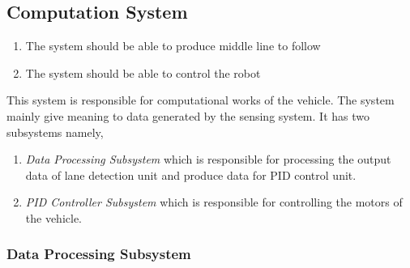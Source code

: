 \documentclass[a4paper,12pt]{article}
\begin{document}
	
	
	
	
			
		
		\subsection{Computation System}
		
		\begin{enumerate}
			\item The system should	be able to produce middle line to follow
			\item The system should be able to control the robot
		\end{enumerate}	
		
			This system is responsible for computational works of the vehicle. The system mainly give meaning to data generated by the sensing system. It has two subsystems namely,
			
			\begin{enumerate}
				\item \textit{Data Processing Subsystem} which is responsible for processing the output data of lane detection unit and produce data for PID control unit.
				\item \textit{PID Controller Subsystem} which is responsible for controlling the motors of the vehicle.
			\end{enumerate}
			
		
		
		\subsubsection{Data Processing Subsystem}\label{sect:dataProcessingSubsystem}
		
\end{document}
